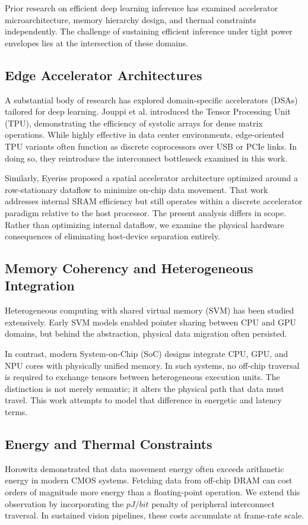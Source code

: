 \documentclass[conference]{IEEEtran}
\begin{document}
Prior research on efficient deep learning inference has examined accelerator microarchitecture, memory hierarchy design, and thermal constraints independently. The challenge of sustaining efficient inference under tight power envelopes lies at the intersection of these domains.

\subsection{Edge Accelerator Architectures}
A substantial body of research has explored domain-specific accelerators (DSAs) tailored for deep learning. Jouppi et al. \cite{b_tpu} introduced the Tensor Processing Unit (TPU), demonstrating the efficiency of systolic arrays for dense matrix operations. While highly effective in data center environments, edge-oriented TPU variants often function as discrete coprocessors over USB or PCIe links. In doing so, they reintroduce the interconnect bottleneck examined in this work.

Similarly, Eyeriss \cite{b_eyeriss} proposed a spatial accelerator architecture optimized around a row-stationary dataflow to minimize on-chip data movement. That work addresses internal SRAM efficiency but still operates within a discrete accelerator paradigm relative to the host processor. The present analysis differs in scope. Rather than optimizing internal dataflow, we examine the physical hardware consequences of eliminating host-device separation entirely.

\subsection{Memory Coherency and Heterogeneous Integration}
Heterogeneous computing with shared virtual memory (SVM) has been studied extensively. Early SVM models enabled pointer sharing between CPU and GPU domains, but behind the abstraction, physical data migration often persisted.

In contrast, modern System-on-Chip (SoC) designs integrate CPU, GPU, and NPU cores with physically unified memory. In such systems, no off-chip traversal is required to exchange tensors between heterogeneous execution units. The distinction is not merely semantic; it alters the physical path that data must travel. This work attempts to model that difference in energetic and latency terms.

\subsection{Energy and Thermal Constraints}
Horowitz \cite{b8} demonstrated that data movement energy often exceeds arithmetic energy in modern CMOS systems. Fetching data from off-chip DRAM can cost orders of magnitude more energy than a floating-point operation. We extend this observation by incorporating the $pJ/bit$ penalty of peripheral interconnect traversal. In sustained vision pipelines, these costs accumulate at frame-rate scale.
\end{document}
